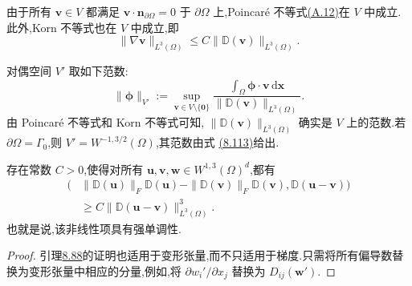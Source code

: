 \begin{note}[分析工具]
\label{note:smagorinsky-generalized-analysis-tools}
由于所有 $\bm{v}\in V$ 都满足 $\bm{v}\cdot\bm{n}_{\partial\Omega}=0$ 于 $\partial\Omega$ 上,Poincaré 不等式\hyperref[eq:appendix-a-12]{(A.12)}在 $V$ 中成立.此外,Korn 不等式也在 $V$ 中成立,即
\begin{equation}\label{eq:smagorinsky-generalized-korn-inequality}
 \|\nabla\bm{v}\|_{L^3(\Omega)}
   \le C\|\mathbb{D}(\bm{v})\|_{L^3(\Omega)}.
\end{equation}
\end{note}


对偶空间 $V'$ 取如下范数:
\begin{equation}\label{eq:smagorinsky-dual-space-norm}
 \|\symbf{\phi}\|_{V'}
 :=\sup_{\bm{v}\in V\setminus\{\bm{0}\}}
       \frac{\int_\Omega\symbf{\phi}\cdot\bm{v}\,\mathrm{d}\bm{x}}
            {\|\mathbb{D}(\bm{v})\|_{L^3(\Omega)}}.
\end{equation}
由 Poincaré 不等式和 Korn 不等式可知,
$\|\mathbb{D}(\bm{v})\|_{L^3(\Omega)}$ 确实是 $V$ 上的范数.若
$\partial\Omega=\Gamma_0$,则 $V'=W^{-1,3/2}(\Omega)$,其范数由式
\hyperref[eq:smagorinsky-dual-space-norm]{(8.113)}给出.

\begin{lemma}[非线性黏性项的强单调性]
\label{lem:smagorinsky-strain-strong-monotonicity}
存在常数 $C>0$,使得对所有
$\bm{u},\bm{v},\bm{w}\in W^{1,3}(\Omega)^d$,都有
\begin{equation}\label{eq:smagorinsky-strain-strong-monotonicity}
\begin{aligned}
 \bigl(&\|\mathbb{D}(\bm{u})\|_F\mathbb{D}(\bm{u})
       -\|\mathbb{D}(\bm{v})\|_F\mathbb{D}(\bm{v}),
       \mathbb{D}(\bm{u}-\bm{v})\bigr)\\
 &\ge C\|\mathbb{D}(\bm{u}-\bm{v})\|_{L^3(\Omega)}^3.
\end{aligned}
\end{equation}
也就是说,该非线性项具有强单调性.
\begin{proof}
引理\hyperref[lem:smagorinsky-strong-monotonicity]{8.88}的证明也适用于变形张量,而不只适用于梯度.只需将所有偏导数替换为变形张量中相应的分量,例如,将 $\partial w_i'/\partial x_j$ 替换为 $D_{ij}(\bm{w}')$.
\end{proof}
\end{lemma}

